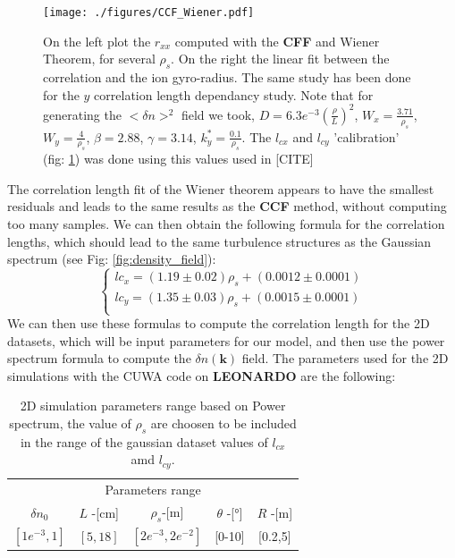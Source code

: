 \documentclass[11pt,a4paper,openany]{report}
\begin{document}
\begin{figure}[H]
    \centering
    \hspace*{-0cm}\texttt{[image: ./figures/CCF\_Wiener.pdf]}
    \caption{On the left plot the $r_{x x}$ computed with the \textbf{CFF} and Wiener Theorem, for several $\rho_s$. On the right the linear fit between the correlation and the ion gyro-radius. The same study has been done for the $y$ correlation length dependancy study.
        Note that for generating the $<\delta n>^2$ field we took, $D = 6.3e^{-3} (\frac{\rho}{L})^2$, $W_x = \frac{3.71}{\rho_s}$, $W_y = \frac{4}{\rho_s}$, $\beta = 2.88$, $\gamma = 3.14$, $k_y^* = \frac{0.1}{\rho_s}$. The $l_{cx}$ and $l_{cy}$ 'calibration' (fig: \ref{Wiener}) was done using this values used in [CITE]}
    \label{Wiener}
\end{figure}
\begin{multicols}{2}
    The correlation length fit of the Wiener theorem appears to have the smallest residuals and leads to the same results as the \textbf{CCF} method, without computing too many samples. We can then obtain the following formula for the correlation lengths, which should lead to the same turbulence structures as the Gaussian spectrum (see Fig: \ref{fig:density_field}):
    \begin{equation*}
        \begin{cases}
            lc_x = (1.19 \pm 0.02) \rho_s + (0.0012 \pm 0.0001) \\
            lc_y = (1.35 \pm 0.03) \rho_s + (0.0015 \pm 0.0001) \\
        \end{cases}
        \label{eq:}
    \end{equation*}
    We can then use these formulas to compute the correlation length for the 2D datasets, which will be input parameters for our model, and then use the power spectrum formula to compute the $\delta n(\textbf{k} )$ field. The parameters used for the 2D simulations with the CUWA code on \textbf{LEONARDO} are the following:

    \setlength{\tabcolsep}{.02\linewidth}

    \begin{table}[H]
        \begin{tabular}{ccccc}
            \toprule
            \multicolumn{5}{c}{Parameters range}                                         \\
            \cmidrule{1 -5}
            $\delta n_0$   & $L$ -[cm] & $\rho_s$-[m]         & $\theta$ -[°] & $R$ -[m] \\
            \midrule
            $[1e^{-3}, 1]$ & $[5,18]$  & $[2e^{-3}, 2e^{-2}]$ & [0-10]        & [0.2,5]  \\
            \bottomrule
        \end{tabular}
        \caption{2D simulation parameters range based on Power spectrum, the value of $\rho_s$ are choosen to be included in the range of the gaussian dataset values of $l_{cx}$ amd $l_{cy}$. }
        \label{Power_table}
    \end{table}


\end{multicols}
\end{document}
